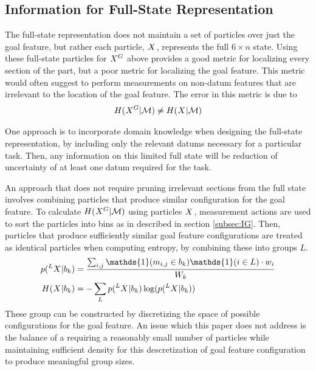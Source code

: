 \documentclass[letterpaper, 10 pt, conference]{ieeeconf}
\newcommand{\maction}{\mathcal{M}}
\newcommand{\bin}{b}
\newcommand{\groups}{L}
\newcommand{\measurement}{m}
\begin{document}
\subsection{Information for Full-State Representation}
The full-state representation does not maintain a set of particles over just the goal feature, but rather each particle, $\particles$, represents the full $6 \times n$ state.
Using these full-state particles for $\particles[][][G]$ above provides a good metric for localizing every section of the part, but a poor metric for localizing the goal feature.
This metric would often suggest to perform measurements on non-datum features that are irrelevant to the location of the goal feature.
The error in this metric is due to
\begin{align}
  H(\particles[][][G]|\maction) \neq H(\particles|\maction)
\end{align}

One approach is to incorporate domain knowledge when designing the full-state representation, by including only the relevant datums necessary for a particular task. 
Then, any information on this limited full state will be reduction of uncertainty of at least one datum required for the task.

An approach that does not require pruning irrelevant sections from the full state involves combining particles that produce similar configuration for the goal feature. 
To calculate $H(\particles[][][G]|\maction)$ using particles $\particles$, measurement actions are used to sort the particles into bins as in described in section \ref{subsec:IG}.
Then, particles that produce sufficiently similar goal feature configurations are treated as identical particles when computing entropy, by combining these into groups $\groups$.
\begin{align}
  p(\particles[][L]|\bin_k) &= 
  \frac{\sum_{i,j} \mathds{1}(\measurement_{i,j} \in \bin_k) \mathds{1}(i \in L) \cdot w_i}{W_k}\\
  H(\particles | \bin_k) &= -\sum_L p(\particles[][L]|\bin_k) \log(p(\particles[][L]|\bin_k))  
\end{align}
These group can be constructed by discretizing the space of possible configurations for the goal feature.
An issue which this paper does not address is the balance of a requiring a reasonably small number of particles while maintaining sufficient density for this descretization of goal feature configuration to produce meaningful group sizes.
\end{document}
